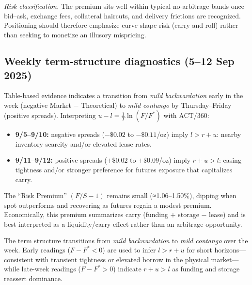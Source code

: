 \documentclass[10pt,a4paper]{article} %
\begin{document}
\medskip
\noindent\emph{Risk classification.} The premium sits well within typical no-arbitrage bands once bid–ask, exchange fees, collateral haircuts, and delivery frictions are recognized. Positioning should therefore emphasize curve-shape risk (carry and roll) rather than seeking to monetize an illusory mispricing.


\subsection{Weekly term-structure diagnostics (5–12 Sep 2025)}
Table-based evidence indicates a transition from \emph{mild backwardation} early in the week (negative Market \(-\) Theoretical) to \emph{mild contango} by Thursday–Friday (positive spreads). Interpreting \(u-l=\tfrac{1}{T}\ln(F/F^{*})\) with ACT/360:
\begin{itemize}
  \item \textbf{9/5–9/10:} negative spreads (\(-\$0.02\) to \(-\$0.11\)/oz) imply \(l>r+u\): nearby inventory scarcity and/or elevated lease rates.
  \item \textbf{9/11–9/12:} positive spreads (\(+\$0.02\) to \(+\$0.09\)/oz) imply \(r+u>l\): easing tightness and/or stronger preference for futures exposure that capitalizes carry.
\end{itemize}
The “Risk Premium” \((F/S-1)\) remains small (≈1.06–1.50\%), dipping when spot outperforms and recovering as futures regain a modest premium. Economically, this premium summarizes carry (funding \(+\) storage \(-\) lease) and is best interpreted as a liquidity/carry effect rather than an arbitrage opportunity.


The term structure transitions from \emph{mild backwardation} to \emph{mild contango} over the week. Early readings (\(F-F^{*}<0\)) are used to infer \(l>r+u\) for short horizons—consistent with transient tightness or elevated borrow in the physical market—while late-week readings (\(F-F^{*}>0\)) indicate \(r+u>l\) as funding and storage reassert dominance.
\end{document}

